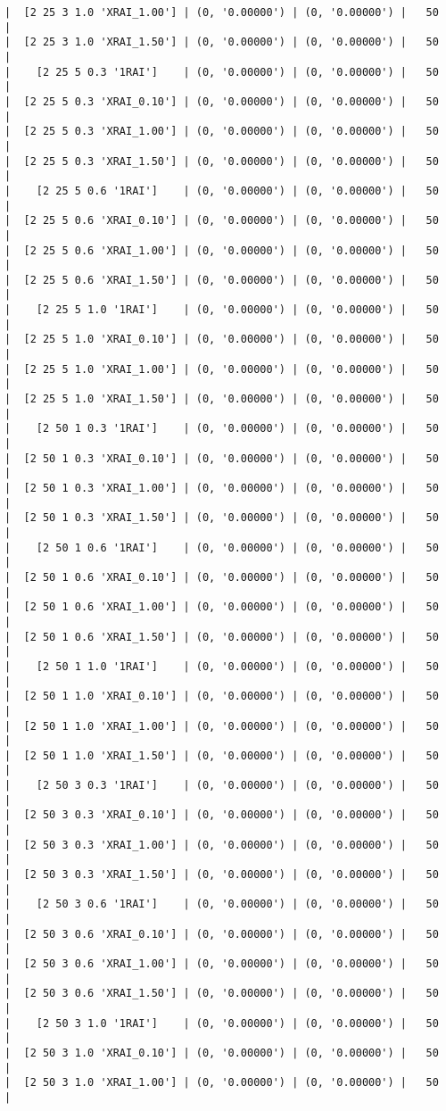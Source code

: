 \documentclass{article}
\begin{document}
\begin{verbatim}
|  [2 25 3 1.0 'XRAI_1.00'] | (0, '0.00000') | (0, '0.00000') |   50  |
|  [2 25 3 1.0 'XRAI_1.50'] | (0, '0.00000') | (0, '0.00000') |   50  |
|    [2 25 5 0.3 '1RAI']    | (0, '0.00000') | (0, '0.00000') |   50  |
|  [2 25 5 0.3 'XRAI_0.10'] | (0, '0.00000') | (0, '0.00000') |   50  |
|  [2 25 5 0.3 'XRAI_1.00'] | (0, '0.00000') | (0, '0.00000') |   50  |
|  [2 25 5 0.3 'XRAI_1.50'] | (0, '0.00000') | (0, '0.00000') |   50  |
|    [2 25 5 0.6 '1RAI']    | (0, '0.00000') | (0, '0.00000') |   50  |
|  [2 25 5 0.6 'XRAI_0.10'] | (0, '0.00000') | (0, '0.00000') |   50  |
|  [2 25 5 0.6 'XRAI_1.00'] | (0, '0.00000') | (0, '0.00000') |   50  |
|  [2 25 5 0.6 'XRAI_1.50'] | (0, '0.00000') | (0, '0.00000') |   50  |
|    [2 25 5 1.0 '1RAI']    | (0, '0.00000') | (0, '0.00000') |   50  |
|  [2 25 5 1.0 'XRAI_0.10'] | (0, '0.00000') | (0, '0.00000') |   50  |
|  [2 25 5 1.0 'XRAI_1.00'] | (0, '0.00000') | (0, '0.00000') |   50  |
|  [2 25 5 1.0 'XRAI_1.50'] | (0, '0.00000') | (0, '0.00000') |   50  |
|    [2 50 1 0.3 '1RAI']    | (0, '0.00000') | (0, '0.00000') |   50  |
|  [2 50 1 0.3 'XRAI_0.10'] | (0, '0.00000') | (0, '0.00000') |   50  |
|  [2 50 1 0.3 'XRAI_1.00'] | (0, '0.00000') | (0, '0.00000') |   50  |
|  [2 50 1 0.3 'XRAI_1.50'] | (0, '0.00000') | (0, '0.00000') |   50  |
|    [2 50 1 0.6 '1RAI']    | (0, '0.00000') | (0, '0.00000') |   50  |
|  [2 50 1 0.6 'XRAI_0.10'] | (0, '0.00000') | (0, '0.00000') |   50  |
|  [2 50 1 0.6 'XRAI_1.00'] | (0, '0.00000') | (0, '0.00000') |   50  |
|  [2 50 1 0.6 'XRAI_1.50'] | (0, '0.00000') | (0, '0.00000') |   50  |
|    [2 50 1 1.0 '1RAI']    | (0, '0.00000') | (0, '0.00000') |   50  |
|  [2 50 1 1.0 'XRAI_0.10'] | (0, '0.00000') | (0, '0.00000') |   50  |
|  [2 50 1 1.0 'XRAI_1.00'] | (0, '0.00000') | (0, '0.00000') |   50  |
|  [2 50 1 1.0 'XRAI_1.50'] | (0, '0.00000') | (0, '0.00000') |   50  |
|    [2 50 3 0.3 '1RAI']    | (0, '0.00000') | (0, '0.00000') |   50  |
|  [2 50 3 0.3 'XRAI_0.10'] | (0, '0.00000') | (0, '0.00000') |   50  |
|  [2 50 3 0.3 'XRAI_1.00'] | (0, '0.00000') | (0, '0.00000') |   50  |
|  [2 50 3 0.3 'XRAI_1.50'] | (0, '0.00000') | (0, '0.00000') |   50  |
|    [2 50 3 0.6 '1RAI']    | (0, '0.00000') | (0, '0.00000') |   50  |
|  [2 50 3 0.6 'XRAI_0.10'] | (0, '0.00000') | (0, '0.00000') |   50  |
|  [2 50 3 0.6 'XRAI_1.00'] | (0, '0.00000') | (0, '0.00000') |   50  |
|  [2 50 3 0.6 'XRAI_1.50'] | (0, '0.00000') | (0, '0.00000') |   50  |
|    [2 50 3 1.0 '1RAI']    | (0, '0.00000') | (0, '0.00000') |   50  |
|  [2 50 3 1.0 'XRAI_0.10'] | (0, '0.00000') | (0, '0.00000') |   50  |
|  [2 50 3 1.0 'XRAI_1.00'] | (0, '0.00000') | (0, '0.00000') |   50  |

\end{verbatim}
\end{document}
